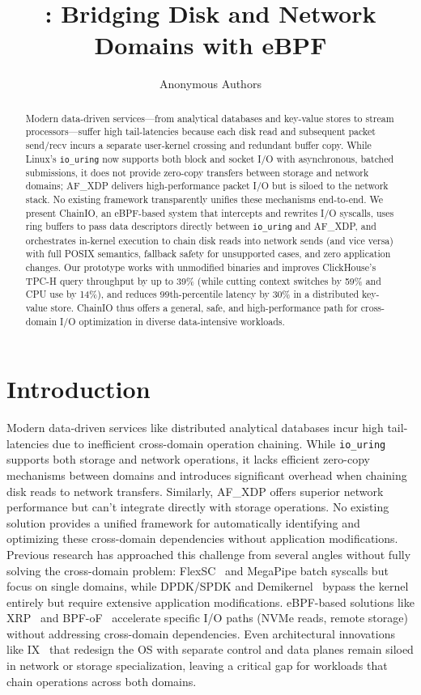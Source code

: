 \documentclass[sigconf,10pt]{acmart}
\title{\sys: Bridging Disk and Network Domains with eBPF}
\author{
Anonymous Authors
}
\newcommand{\sys}{ChainIO\xspace}
\begin{document}
\begin{abstract}
Modern data-driven services—from analytical databases and key-value stores to stream processors—suffer high tail-latencies because each disk read and subsequent packet send/recv incurs a separate user-kernel crossing and redundant buffer copy. While Linux’s \texttt{io\_uring} now supports both block and socket I/O with asynchronous, batched submissions, it does not provide zero-copy transfers between storage and network domains; AF\_XDP delivers high-performance packet I/O but is siloed to the network stack. No existing framework transparently unifies these mechanisms end-to-end. We present \sys, an eBPF-based system that intercepts and rewrites I/O syscalls, uses ring buffers to pass data descriptors directly between \texttt{io\_uring} and AF\_XDP, and orchestrates in-kernel execution to chain disk reads into network sends (and vice versa) with full POSIX semantics, fallback safety for unsupported cases, and zero application changes. Our prototype works with unmodified binaries and improves ClickHouse’s TPC-H query throughput by up to 39\% (while cutting context switches by 59\% and CPU use by 14\%), and reduces 99th-percentile latency by 30\% in a distributed key-value store. \sys thus offers a general, safe, and high-performance path for cross-domain I/O optimization in diverse data-intensive workloads.
\end{abstract}

\maketitle

\section{Introduction}

Modern data-driven services like distributed analytical databases incur high tail-latencies due to inefficient cross-domain operation chaining. While \texttt{io\_uring} supports both storage and network operations, it lacks efficient zero-copy mechanisms between domains and introduces significant overhead when chaining disk reads to network transfers. Similarly, AF\_XDP offers superior network performance but can't integrate directly with storage operations. No existing solution provides a unified framework for automatically identifying and optimizing these cross-domain dependencies without application modifications. Previous research has approached this challenge from several angles without fully solving the cross-domain problem: FlexSC~\cite{flexsc} and MegaPipe batch syscalls but focus on single domains, while DPDK/SPDK and Demikernel~\cite{zhang2021demikernel} bypass the kernel entirely but require extensive application modifications. eBPF-based solutions like XRP~\cite{Zhong22} and BPF-oF~\cite{zarkadas2023bpf} accelerate specific I/O paths (NVMe reads, remote storage) without addressing cross-domain dependencies. Even architectural innovations like IX~\cite{ix} that redesign the OS with separate control and data planes remain siloed in network or storage specialization, leaving a critical gap for workloads that chain operations across both domains.
\end{document}
